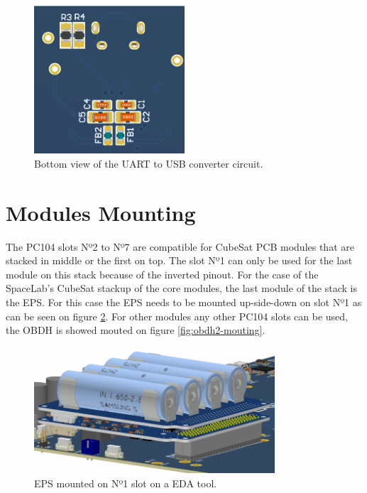 \begin{figure}[!ht]
    \begin{center}
        \includegraphics[width=0.5\textwidth]{figures/ft4232h_circuit_bottom.png}
        \caption{Bottom view of the UART to USB converter circuit.}
        \label{fig:R4-pad}
    \end{center}
\end{figure}

\section{Modules Mounting}

The PC104 slots Nº2 to Nº7 are compatible for CubeSat PCB modules that are stacked in middle or the first on top. The slot Nº1 can only be used for the last module on this stack because of the inverted pinout. For the case of the SpaceLab's CubeSat stackup of the core modules, the last module of the stack is the EPS. For this case the EPS needs to be mounted up-side-down on slot Nº1 as can be seen on figure \ref{fig:eps2-mouting}. For other modules any other PC104 slots can be used, the OBDH is showed mouted on figure \ref{fig:obdh2-mouting}. 

\begin{figure}[!ht]
    \begin{center}
        \includegraphics[width=0.8\textwidth]{figures/eps2_mouting.png}
        \caption{EPS mounted on Nº1 slot on a EDA tool.}
        \label{fig:eps2-mouting}
    \end{center}
\end{figure}

